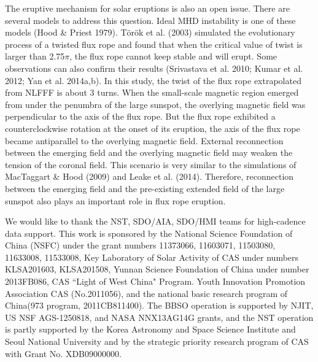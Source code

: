 \documentclass[12pt,preprint]{aastex}
\begin{document}
\begin{CJK*}{UTF8}{gbsn}
The eruptive mechanism for solar eruptions is also an open issue. There are several models to address this question. Ideal MHD instability is one of these models (Hood \& Priest 1979). T{\"o}r{\"o}k et al. (2003) simulated the evolutionary process of a twisted flux rope and found that when the critical value of twist is larger than 2.75$\pi$, the flux rope cannot keep stable and will erupt. Some observations can also confirm their results (Srivastava et al. 2010; Kumar et al. 2012; Yan et al. 2014a,b). In this study, the twist of the flux rope extrapolated from NLFFF is about 3 turns. When the small-scale magnetic region emerged from under the penumbra of the large sunspot, the overlying magnetic field was perpendicular to the axis of the flux rope. But the flux rope exhibited a counterclockwise rotation at the onset of its eruption, the axis of the flux rope became antiparallel to the overlying magnetic field. External reconnection between the emerging field and the overlying magnetic field may weaken the tension of the coronal field. This scenario is very similar to the simulations of MacTaggart \& Hood (2009) and Leake et al. (2014). Therefore, reconnection between the emerging field and the pre-existing extended field of the large sunspot also plays an important role in flux rope eruption.


\acknowledgments 
We would like to thank the NST, SDO/AIA, SDO/HMI teams for high-cadence data support. This work is sponsored by the National Science Foundation of China (NSFC) under the grant numbers 11373066, 11603071, 11503080, 11633008, 11533008, Key Laboratory of Solar Activity of CAS under numbers KLSA201603, KLSA201508, Yunnan Science Foundation of China under number 2013FB086, CAS ``Light of West China" Program. Youth Innovation Promotion Association CAS (No.2011056), and the national basic research program of China(973 program, 2011CB811400). The BBSO operation is supported by NJIT, US NSF AGS-1250818, and NASA NNX13AG14G grants, and the NST operation is partly supported by the Korea Astronomy and Space Science Institute and Seoul National University and by the strategic priority research program of CAS with Grant No. XDB09000000. 


\end{CJK*}
\end{document}
